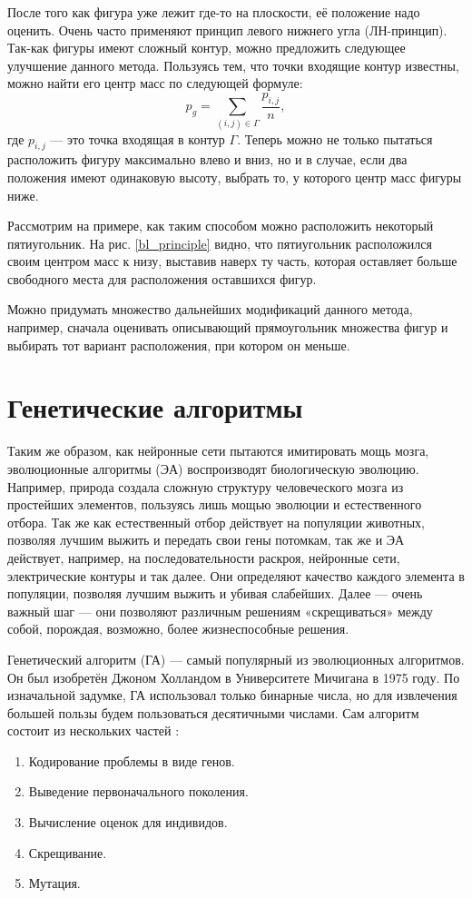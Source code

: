 \documentclass[14pt]{extarticle}
\begin{document}
	После того как фигура уже лежит где-то на плоскости, её положение надо оценить.
	Очень часто применяют принцип левого нижнего угла (ЛН-принцип). Так-как фигуры
	имеют сложный контур, можно предложить следующее улучшение данного метода. Пользуясь тем, что точки входящие контур известны, можно найти его центр масс по следующей формуле:
	\begin{equation}
		p_g=\sum_{(i,j)\in\Gamma}\frac{p_{i, j}}{n},
	\end{equation}
	где $p_{i, j}$ --- это точка входящая в контур $\Gamma$. Теперь можно не только пытаться расположить
	фигуру максимально влево и вниз, но и в случае, если два положения имеют одинаковую
	высоту, выбрать то, у которого центр масс фигуры ниже.


	Рассмотрим на примере, как таким способом можно расположить некоторый пятиугольник. На рис. \ref{bl_principle} видно, что пятиугольник расположился своим центром масс к низу, выставив наверх ту часть, которая оставляет больше свободного места для расположения оставшихся фигур.
	


	Можно придумать множество дальнейших модификаций данного метода, например, сначала оценивать описывающий прямоугольник множества фигур и выбирать тот вариант расположения, при котором он меньше.
	\section{Генетические алгоритмы}
	Таким же образом, как нейронные сети пытаются имитировать мощь мозга, эволюционные алгоритмы (ЭА) воспроизводят биологическую эволюцию. Например, природа создала сложную структуру человеческого мозга из простейших элементов, пользуясь лишь мощью эволюции и естественного отбора. Так же как естественный отбор действует на популяции животных, позволяя лучшим выжить и передать свои гены потомкам, так же и ЭА действует, например, на последовательности раскроя, нейронные сети, электрические контуры и так далее. Они определяют качество каждого элемента в популяции, позволяя
	лучшим выжить и убивая слабейших. Далее --- очень важный шаг --- они позволяют различным решениям «скрещиваться» между собой, порождая, возможно, более жизнеспособные
	решения.


	Генетический алгоритм (ГА) --- самый популярный из эволюционных алгоритмов. Он был изобретён Джоном Холландом в Университете Мичигана в 1975 году. По изначальной задумке, ГА использовал только бинарные числа, но для извлечения большей пользы будем пользоваться десятичными числами. Сам алгоритм состоит из нескольких частей \cite{McLeod}:
	\begin{enumerate}
		\item Кодирование проблемы в виде генов.
		\item Выведение первоначального поколения.
		\item Вычисление оценок для индивидов.
		\item Скрещивание.
		\item Мутация.
	\end{enumerate}
\end{document}
